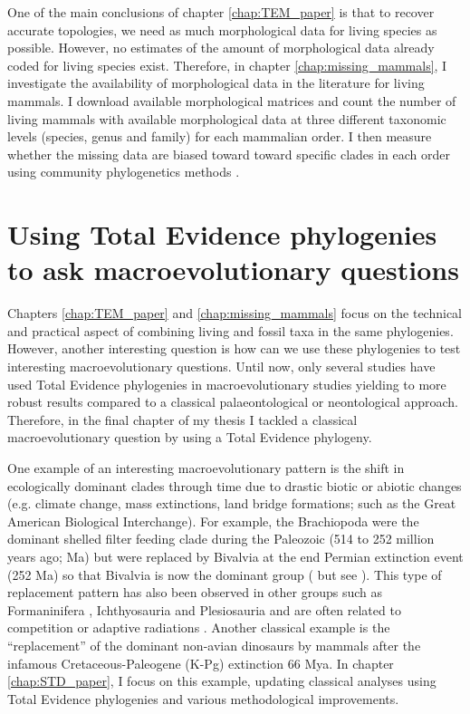 One of the main conclusions of chapter \ref{chap:TEM_paper} is that to recover accurate topologies, we need as much morphological data for living species as possible.
However, no estimates of the amount of morphological data already coded for living species exist.
Therefore, in chapter \ref{chap:missing_mammals}, I investigate the availability of morphological data in the literature for living mammals.
I download available morphological matrices and count the number of living mammals with available morphological data at three different taxonomic levels (species, genus and family) for each mammalian order.
I then measure whether the missing data are biased toward toward specific clades in each order using community phylogenetics methods \citep{webb2002phylogenies}.


\section{Using Total Evidence phylogenies to ask macroevolutionary questions}
Chapters \ref{chap:TEM_paper} and \ref{chap:missing_mammals} focus on the technical and practical aspect of combining living and fossil taxa in the same phylogenies.
However, another interesting question is how can we use these phylogenies to test interesting macroevolutionary questions.
Until now, only several studies have used Total Evidence phylogenies in macroevolutionary studies \citep[e.g.][]{Wood01032013,slaterphylogenetic2013,beckancient2014,Dembo2015} %
yielding to more robust results compared to a classical palaeontological or neontological approach.
Therefore, in the final chapter of my thesis I tackled a classical macroevolutionary question by using a Total Evidence phylogeny. 

One example of an interesting macroevolutionary pattern is the shift in ecologically dominant clades through time due to drastic biotic or abiotic changes (e.g. climate change, mass extinctions, land bridge formations; such as the Great American Biological Interchange).
For example, the Brachiopoda were the dominant shelled filter feeding clade during the Paleozoic (514 to 252 million years ago; Ma) but were replaced by Bivalvia at the end Permian extinction event (252 Ma) so that Bivalvia is now the dominant group (\citealt{Sepkiski1981,CLAPHAM01102006,Liow2015} but see \citealt{Payne22052014}).
This type of replacement pattern has also been observed in other groups such as Formaninifera \citep{Coxall01042006}, Ichthyosauria \citep{thorneresetting2011} and Plesiosauria \citep{bensonfaunal2014} and are often related to competition \citep{brusatte50} or adaptive radiations \citep{Losos2010}.
Another classical example is the ``replacement'' of the dominant non-avian dinosaurs by mammals after the infamous Cretaceous-Paleogene (K-Pg) extinction 66 Mya.
In chapter \ref{chap:STD_paper}, I focus on this example, updating classical analyses using Total Evidence phylogenies and various methodological improvements.

